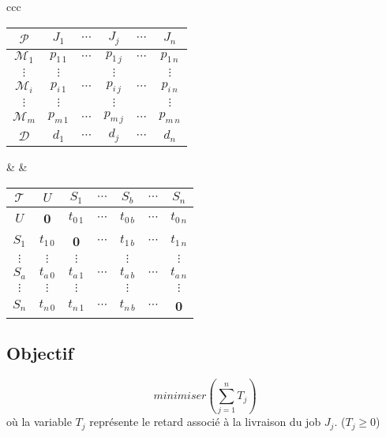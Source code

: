 \begin{center}

\begin{tabular}{ccc}

\begin{tabular}{c|ccccc|}
$ \mathcal{P} $ & $ J_{1} $ & $ \cdots $ & $ J_{j} $ & $ \cdots $ & $ J_{n} $ \\
\hline
$ \mathcal{M}_{1} $ & $ p_{1 \, 1} $ & $ \cdots $ & $ p_{1 \, j} $ & $ \cdots $ & $ p_{1 \, n} $ \\
$ \vdots $ & $ \vdots $ & & $ \vdots $ & & $ \vdots $ \\
$ \mathcal{M}_{i} $ & $ p_{i \, 1} $ & $ \cdots $ & $ p_{i \, j} $ & $ \cdots $ & $ p_{i \, n} $ \\
$ \vdots $ & $ \vdots $ & & $ \vdots $ & & $ \vdots $ \\
$ \mathcal{M}_{m} $ & $ p_{m \, 1} $ & $ \cdots $ & $ p_{m \, j} $ & $ \cdots $ & $ p_{m \, n} $ \\
\hline
$ \mathcal{D} $ & $ d_{1} $ & $ \cdots $ & $ d_{j} $ & $ \cdots $ & $ d_{n} $ \\
\hline
\end{tabular}

& &

\begin{tabular}{c|cccccc|}
$ \mathcal{T} $ & $ U $ & $ S_{1} $ & $ \cdots $ & $ S_{b} $ & $ \cdots $ & $ S_{n} $ \\
\hline
$ U $ & \textbf{0} & $ t_{0 \, 1} $ & $ \cdots $ & $ t_{0 \, b} $ & $ \cdots $ & $ t_{0 \, n} $ \\
$ S_{1} $ & $ t_{1 \, 0} $ & \textbf{0} & $ \cdots $ & $ t_{1 \, b} $ & $ \cdots $ & $ t_{1 \, n} $ \\
$ \vdots $ & $ \vdots $ & $ \vdots $ & & $ \vdots $ & & $ \vdots $ \\
$ S_{a} $ & $ t_{a \, 0} $ & $ t_{a \, 1} $ & $ \cdots $ & $ t_{a \, b} $ & $ \cdots $ & $ t_{a \, n} $ \\
$ \vdots $ & $ \vdots $ & $ \vdots $ & & $ \vdots $ & & $ \vdots $ \\
$ S_{n} $ & $ t_{n \, 0} $ & $ t_{n \, 1} $ & $ \cdots $ & $ t_{n \, b} $ & $ \cdots $ & \textbf{0} \\
\hline
\end{tabular}

\end{tabular}

\end{center}

\subsection*{Objectif}

\begin{center}
\[ minimiser \left( \sum_{j = 1}^{n}{T_j} \right) \]
où la variable $ T_j $ représente le retard associé à la livraison du job $ J_j $. ($ T_j \geq 0 $)
\end{center}